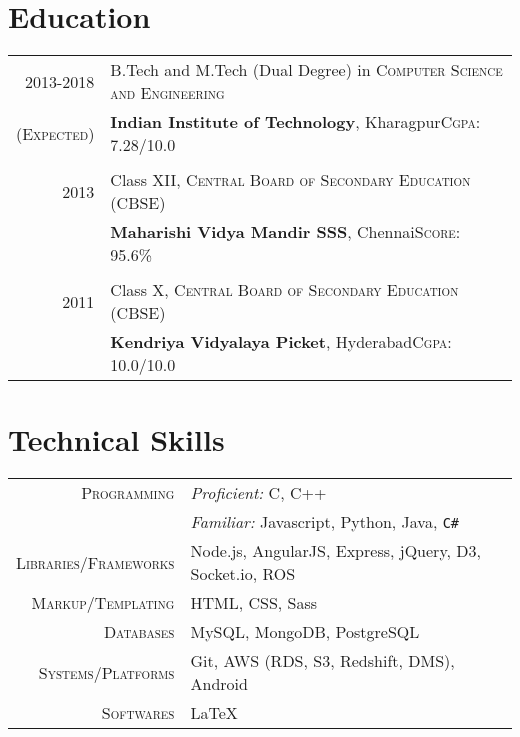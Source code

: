 \documentclass[a4paper,10pt]{extarticle} %
\begin{document}
\section{Education}

\begin{tabular}{r|p{16cm}}	
2013-2018 & B.Tech and M.Tech (Dual Degree) in \textsc{Computer Science and Engineering}\\
\textsc{(Expected)}&\textbf{Indian Institute of Technology}, Kharagpur\hfill\textsc{Cgpa}: 7.28/10.0\\
&\\


2013& Class XII, \textsc{}\textsc{Central Board of Secondary Education (CBSE)} \\
&\normalsize\textbf{Maharishi Vidya Mandir SSS}, Chennai\hfill\textsc{Score}: 95.6\%\\
&\\


2011 & Class X, \textsc{}\textsc{Central Board of Secondary Education (CBSE)} \\
&\normalsize\textbf{Kendriya Vidyalaya Picket}, Hyderabad\hfill\textsc{Cgpa}: 10.0/10.0\\

\end{tabular}


\section{Technical Skills}

\begin{tabular}{r|p{16cm}}
\textsc{Programming} & {\itshape{Proficient:}} C, C++\\
& {\itshape{Familiar:}} Javascript, Python, Java, \verb!C#! \\
\textsc{Libraries/Frameworks} & Node.js, AngularJS, Express, jQuery, D3, Socket.io, ROS\\
\textsc{Markup/Templating} & HTML, CSS, Sass\\
\textsc{Databases} & MySQL, MongoDB, PostgreSQL\\
\textsc{Systems/Platforms} & Git, AWS (RDS, S3, Redshift, DMS), Android\\
\textsc{Softwares} & \LaTeX\\
\end{tabular}
\end{document}
